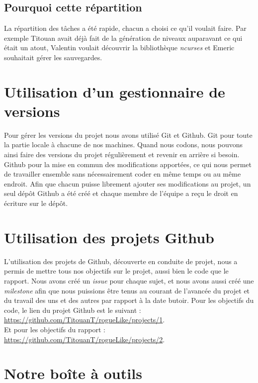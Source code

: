 \documentclass[11pt]{report}
\begin{document}
		\subsection{Pourquoi cette répartition}
		
		La répartition des tâches a été rapide, chacun a choisi ce qu'il voulait faire. Par exemple Titouan avait déjà fait de la génération de niveaux auparavant ce qui était un atout, Valentin voulait découvrir la bibliothèque \emph{ncurses} et Emeric souhaitait gérer les sauvegardes.

	\section{Utilisation d'un gestionnaire de versions}
	
		Pour gérer les versions du projet nous avons utilisé Git et Github. Git pour toute la partie locale à chacune de nos machines. Quand nous codons, nous pouvons ainsi faire des versions du projet régulièrement et revenir en arrière si besoin. Github pour la mise en commun des modifications apportées, ce qui nous permet de travailler ensemble sans nécessairement coder en même temps ou au même endroit. Afin que chacun puisse librement ajouter ses modifications au projet, un seul dépôt Github a été créé et chaque membre de l'équipe a reçu le droit en écriture sur le dépôt.
	
	\section{Utilisation des projets Github}
	
		L'utilisation des projets de Github, découverte en conduite de projet, nous a permis de mettre tous nos objectifs sur le projet, aussi bien le code que le rapport. Nous avons créé un \emph{issue} pour chaque sujet, et nous avons aussi créé une \emph{milestone} afin que nous puissions être tenus au courant de l'avancée du projet et du travail des uns et des autres par rapport à la date butoir.
		Pour les objectifs du code, le lien du projet Github est le suivant : \href{https://github.com/TitouanT/rogueLike/projects/1}{ https://github.com/TitouanT/rogueLike/projects/1}. \\
		Et pour les objectifs du rapport :  \href{https://github.com/TitouanT/rogueLike/projects/2} {https://github.com/TitouanT/rogueLike/projects/2}.

	\section{Notre boîte à outils} 
\end{document}
